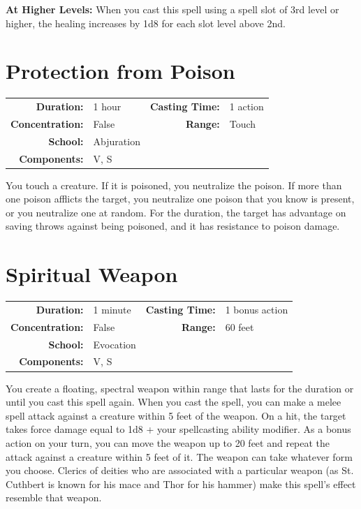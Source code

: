 \documentclass[12pt,showtrims]{memoir}
\begin{document}
\vspace{8pt} \noindent\textbf{At Higher Levels:} When you cast this spell using a spell slot of 3rd level or higher, the healing increases by 1d8 for each slot level above 2nd.
\newpage
\section*{Protection from Poison}

{
\small\centering\vspace{-6pt}
\begin{tabular}{rlrl}
\toprule

\textbf{Duration:} & 1 hour &
\textbf{Casting Time:} & 1 action \\
\textbf{Concentration:} & False &
\textbf{Range:} & Touch \\
\textbf{School:} & Abjuration \\
\textbf{Components:} & \multicolumn{3}{p{0.7\textwidth}}{V, S}\\

\bottomrule
\end{tabular}
}

\vspace{1\baselineskip}\noindent You touch a creature. If it is poisoned, you neutralize the poison. If more than one poison afflicts the target, you neutralize one poison that you know is present, or you neutralize one at random. For the duration, the target has advantage on saving throws against being poisoned, and it has resistance to poison damage.

\newpage
\section*{Spiritual Weapon}

{
\small\centering\vspace{-6pt}
\begin{tabular}{rlrl}
\toprule

\textbf{Duration:} & 1 minute &
\textbf{Casting Time:} & 1 bonus action \\
\textbf{Concentration:} & False &
\textbf{Range:} & 60 feet \\
\textbf{School:} & Evocation \\
\textbf{Components:} & \multicolumn{3}{p{0.7\textwidth}}{V, S}\\

\bottomrule
\end{tabular}
}

\vspace{1\baselineskip}\noindent You create a floating, spectral weapon within range that lasts for the duration or until you cast this spell again. When you cast the spell, you can make a melee spell attack against a creature within 5 feet of the weapon. On a hit, the target takes force damage equal to 1d8 + your spellcasting ability modifier. As a bonus action on your turn, you can move the weapon up to 20 feet and repeat the attack against a creature within 5 feet of it. The weapon can take whatever form you choose. Clerics of deities who are associated with a particular weapon (as St. Cuthbert is known for his mace and Thor for his hammer) make this spell's effect resemble that weapon.
\end{document}
